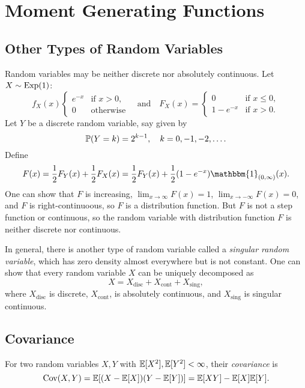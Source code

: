 \chapter{Moment Generating Functions}

\section{Other Types of Random Variables}
\begin{example} \label{ex:other-rv}
  Random variables may be neither discrete nor
  absolutely continuous. Let $X \sim \operatorname{Exp}(1)$:
  \[
    f_X(x)
    \begin{cases}
      e^{-x} & \text{if $x > 0$}, \\
      0 & \text{otherwise}
    \end{cases}
    \quad \text{and} \quad
    F_X(x) =
    \begin{cases}
      0 & \text{if $x \leq 0$}, \\
      1 - e^{-x} & \text{if $x > 0$}.
    \end{cases}
  \]
  Let $Y$ be a discrete random variable, say
  given by
  \[
    \mathbb{P}(Y = k) = 2^{k - 1}, \quad k = 0, -1, -2, \ldots.
  \]
  Define
  \[
    F(x) = \frac{1}{2} F_Y(x) + \frac{1}{2} F_X(x)
    = \frac{1}{2} F_Y(x) + \frac{1}{2}(1 - e^{-x}) \mathbbm{1}_{(0, \infty)}(x).
  \]
  One can show that
  $F$ is increasing, $\lim_{x \to \infty} F(x) = 1$,
  $\lim_{x \to -\infty} F(x) = 0$, and $F$ is
  right-continuoous, so $F$ is a distribution function.
  But $F$ is not a step function or continuous, so
  the random variable with distribution function
  $F$ is neither discrete nor continuous.
\end{example}

\begin{remark}
  In general, there is another type of random
  variable called a \emph{singular random variable},
  which has zero density almost everywhere but is
  not constant. One can show that every random
  variable $X$ can be uniquely decomposed as
  \[
    X = X_{\text{disc}} + X_{\text{cont}} + X_{\text{sing}},
  \]
  where $X_{\text{disc}}$ is discrete, $X_{\text{cont}}$,
  is absolutely continuous, and
  $X_{\text{sing}}$ is singular continuous.
\end{remark}

\section{Covariance}
\begin{definition}
  For two random variables $X, Y$ with
  $\mathbb{E}[X^2], \mathbb{E}[Y^2] < \infty$, their \emph{covariance}
  is
  \[
    \operatorname{Cov}(X, Y) = \mathbb{E}[(X - \mathbb{E}[X])(Y - \mathbb{E}[Y])]
    = \mathbb{E}[XY] - \mathbb{E}[X]\mathbb{E}[Y].
  \]
\end{definition}

